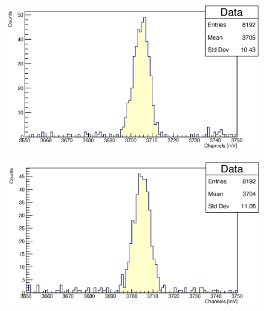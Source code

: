 \documentclass[a4paper,10pt]{article}
\newcommand\blankpage{%
    \null
    \thispagestyle{empty}%
    \addtocounter{page}{-1}%
    \newpage}
\begin{document}
\begin{figure}[H]
    \centering
    \includegraphics[scale=0.45]{appendice/spettri/ThA_1460_16}
\end{figure}
\begin{figure}[H]
    \centering
    \includegraphics[scale=0.45]{appendice/spettri/ThA_1460_20}
\end{figure}
\newpage
\afterpage{\blankpage}
\end{document}
